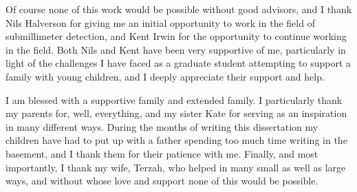 \documentclass[12pt,letterpaper,openany]{memoir}
\numberwithin{equation}{chapter}
\numberwithin{figure}{chapter}
\numberwithin{table}{chapter}
\begin{document}
Of course none of this work would be possible without good advisors, and I thank Nils Halverson for giving me an initial opportunity to work in the field of submillimeter detection, and Kent Irwin for the opportunity to continue working in the field.
Both Nils and Kent have been very supportive of me, particularly in light of the challenges I have faced as a graduate student attempting to support a family with young children, and I deeply appreciate their support and help.

I am blessed with a supportive family and extended family. I particularly thank my parents for, well, everything, and my sister Kate for serving as an inspiration in many different ways.
During the months of writing this dissertation my children have had to put up with a father spending too much time writing in the basement, and I thank them for their patience with me.
Finally, and most importantly, I thank my wife, Terzah, who helped in many small as well as large ways, and without whose love and support none of this would be possible.

\newpage

\tableofcontents* %

\newpage
\listoftables

\newpage
\listoffigures

\mainmatter

















\SingleSpacing
\printbibliography
\end{document}
